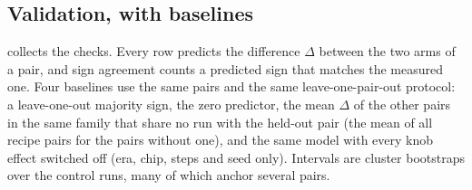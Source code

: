 \subsection{Validation, with baselines}
\label{sec:simval}

 collects the checks. Every row predicts the difference $\Delta$ between the two arms of a
pair, and sign agreement counts a predicted sign that matches the measured one. Four baselines use the same pairs and
the same leave-one-pair-out protocol: a leave-one-out majority sign, the zero predictor, the mean $\Delta$ of the
other pairs in the same family that share no run with the held-out pair (the mean of all recipe pairs for the
 pairs without one), and the same model with every knob effect switched off (era, chip, steps
and seed only). Intervals are cluster bootstraps over the  control runs, many of which anchor
several pairs.

\begin{table}[tbp]
  \centering
  \caption{\textbf{Quality-surrogate calibration and baselines.} Sign agreement on treatment/control pairs; MAE of the
    predicted difference in $10^{-3}$ bpb. $\hat\Delta$: predicted, $\Delta$: measured difference. ``Recipe pairs''
    exclude the  seed and chip pairs, on which sign agreement is meaningless. Sign intervals are
    cluster bootstraps over control runs; for the majority sign, each pair's leave-one-out prediction is held fixed
    and the control-run clusters are resampled. The temporal rows compare the surrogate with the steps-only model and
    the zero predictor fitted and scored on the same pairs. \textsuperscript{$\dagger$}\,Per-pair values from
    \texttt{docs/simulator-report-20260929.md}, scored by \texttt{paper/analysis/simulator.py} (\cref{tab:postfit});
    its interval is a Wilson interval, too narrow because several pairs share a control.}
  \label{tab:sim-calibration}
  
\end{table}

